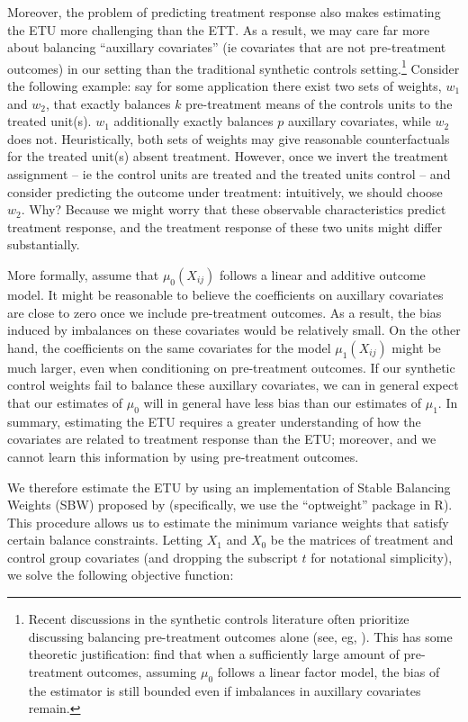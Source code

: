 \documentclass[12pt]{article}
\begin{document}
Moreover, the problem of predicting treatment response also makes estimating the ETU more challenging than the ETT. As a result, we may care far more about balancing ``auxillary covariates'' (ie covariates that are not pre-treatment outcomes) in our setting than the traditional synthetic controls setting.\footnote{Recent discussions in the synthetic controls literature often prioritize discussing balancing pre-treatment outcomes alone (see, eg, \cite{doudchenko2016balancing}). This has some theoretic justification: \cite{botosaru2019role} find that when a sufficiently large amount of pre-treatment outcomes, assuming $\mu_0$ follows a linear factor model, the bias of the estimator is still bounded even if imbalances in auxillary covariates remain.} Consider the following example: say for some application there exist two sets of weights, $w_1$ and $w_2$, that exactly balances $k$ pre-treatment means of the controls units to the treated unit(s). $w_1$ additionally exactly balances $p$ auxillary covariates, while $w_2$ does not. Heuristically, both sets of weights may give reasonable counterfactuals for the treated unit(s) absent treatment. However, once we invert the treatment assignment -- ie the control units are treated and the treated units control -- and consider predicting the outcome under treatment: intuitively, we should choose $w_2$. Why? Because we might worry that these observable characteristics predict treatment response, and the treatment response of these two units might differ substantially. 

More formally, assume that $\mu_0(X_{ij})$ follows a linear and additive outcome model. It might be reasonable to believe the coefficients on auxillary covariates are close to zero once we include pre-treatment outcomes. As a result, the bias induced by imbalances on these covariates would be relatively small. On the other hand, the coefficients on the same covariates for the model $\mu_1(X_{ij})$ might be much larger, even when conditioning on pre-treatment outcomes. If our synthetic control weights fail to balance these auxillary covariates, we can in general expect that our estimates of $\mu_0$ will in general have less bias than our estimates of $\mu_1$. In summary, estimating the ETU requires a greater understanding of how the covariates are related to treatment response than the ETU; moreover, and we cannot learn this information by using pre-treatment outcomes.

We therefore estimate the ETU by using an implementation of Stable Balancing Weights (SBW) proposed by \cite{zubizarreta2015stable} (specifically, we use the ``optweight'' package in R). This procedure allows us to estimate the minimum variance weights that satisfy certain balance constraints. Letting $X_1$ and $X_0$ be the matrices of treatment and control group covariates (and dropping the subscript $t$ for notational simplicity), we solve the following objective function:
\end{document}
